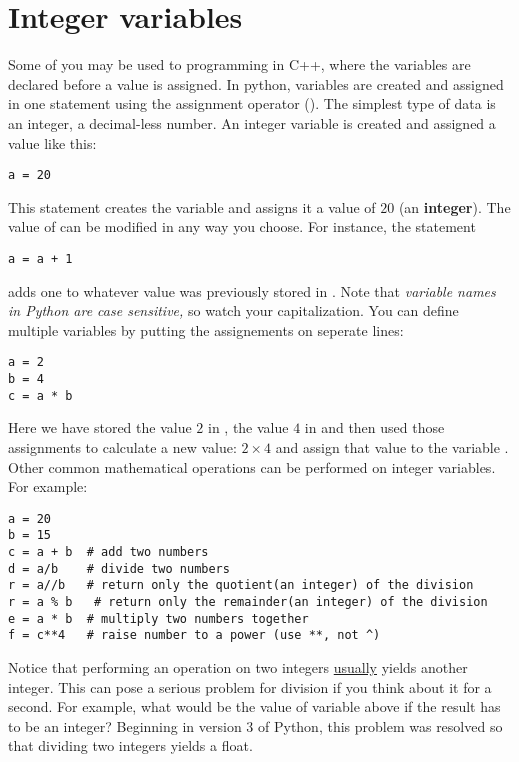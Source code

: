 \section{Integer variables}
Some of you may be used to programming in C++, where
the variables are declared before a value is assigned.  In python,
variables are created and assigned in one statement using the
assignment operator (\code{=}).  The simplest type of data is an
integer, a decimal-less number.  An integer variable is created and
assigned a value like this:
\begin{Verbatim}
a = 20
\end{Verbatim}
This statement creates the variable  and assigns it a value of
$20$ (an \textbf{integer}).  The value of  can be modified in
any way you choose.  For instance, the statement
\begin{Verbatim}
a = a + 1
\end{Verbatim}
adds one to whatever value was previously stored in
.   Note that {\it variable names
  in Python are case sensitive,} so watch your capitalization.
You can define multiple variables by putting the assignements on
seperate lines:
\begin{Verbatim}
a = 2
b = 4
c = a * b
\end{Verbatim}
Here we have stored the value $2$ in , the value $4$ in
 and then used those assignments to calculate a new value: $ 2
\times 4$ and assign that value to the variable .
Other common mathematical operations can be performed on integer
variables.  For example:
\begin{Verbatim}
a = 20
b = 15
c = a + b  # add two numbers
d = a/b    # divide two numbers
r = a//b   # return only the quotient(an integer) of the division
r = a % b   # return only the remainder(an integer) of the division
e = a * b  # multiply two numbers together
f = c**4   # raise number to a power (use **, not ^)
\end{Verbatim}
Notice that performing an operation on two integers \ul{usually}
yields another integer.  This can pose a serious problem for division
if you think about it for a second. For example, what would be the
value of variable  above if the result has to be an integer?
Beginning in version 3 of Python, this problem was resolved so that
dividing two integers yields a float.  

